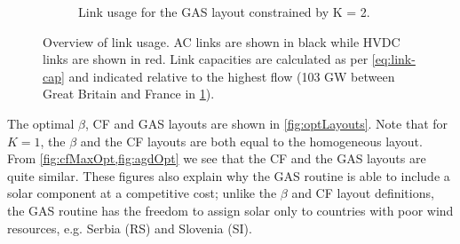 \documentclass[a4paper, 5p, sort&compress]{elsarticle}%
\begin{document}
\begin{figure}[t!]
\begin{subfigure}{1\columnwidth}
    \caption{Link usage for the GAS layout constrained by K = 2.}
    \label{fig:links-k2}
  \end{subfigure}
  \caption{Overview of link usage. AC links are shown in black while
    HVDC links are shown in red. Link capacities are calculated as per
    \cref{eq:link-cap} and indicated relative to the highest flow (103 GW
    between Great Britain and France in \cref{fig:links-k2}).}
  \label{fig:links}
\end{figure}

The optimal $\beta$, CF and GAS layouts are shown in
\cref{fig:optLayouts}. Note that for $K=1$, the $\beta$ and the
CF layouts are both equal to the homogeneous layout. From
\cref{fig:cfMaxOpt,fig:agdOpt} we see that the CF and the GAS
layouts are quite similar. These figures also explain why the GAS
routine is able to include a solar component at a competitive cost;
unlike the $\beta$ and CF layout definitions, the GAS routine has
the freedom to assign solar only to countries with poor wind
resources, e.g. Serbia (RS) and Slovenia (SI).

\end{document}
